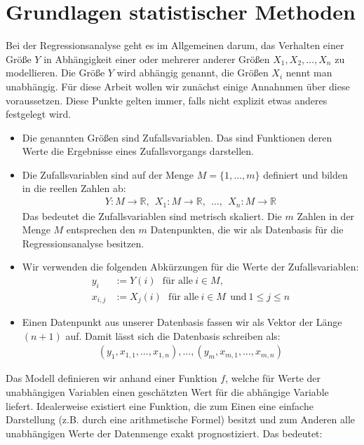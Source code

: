 \chapter{Grundlagen statistischer Methoden}

Bei der Regressionsanalyse geht es im Allgemeinen darum, das Verhalten einer Größe $Y$ in Abhängigkeit einer oder mehrerer anderer Größen $X_1, X_2, \dots, X_n$ zu modellieren. Die Größe $Y$ wird abhängig genannt, die Größen $X_i$ nennt man unabhängig. Für diese Arbeit wollen wir zunächst einige Annahnmen über diese voraussetzen. Diese Punkte gelten immer, falls nicht explizit etwas anderes festgelegt wird.
\begin{itemize}
    \item Die genannten Größen sind Zufallsvariablen. Das sind Funktionen deren Werte die Ergebnisse eines Zufallsvorgangs darstellen.
    \item Die Zufallsvariablen sind auf der Menge $M = \{1, \dots, m\}$ definiert und bilden in die reellen Zahlen ab:
    \begin{align*}
        Y: M \rightarrow \mathbb{R},~~ X_1: M \rightarrow \mathbb{R},~~ \dots,~~ X_n: M \rightarrow \mathbb{R}
    \end{align*}
    Das bedeutet die Zufallsvariablen sind metrisch skaliert. Die $m$ Zahlen in der Menge $M$ entsprechen den $m$ Datenpunkten, die wir als Datenbasis für die Regressionsanalyse besitzen.
    \item Wir verwenden die folgenden Abkürzungen für die Werte der Zufallsvariablen:
    \begin{align*}
        y_i &:= Y(i) ~~~\text{für alle}~ i \in M,\\
        x_{i, j} &:= X_j(i) ~~~\text{für alle}~ i \in M ~~\text{und}~ 1 \leq j \leq n
    \end{align*}
    \item Einen Datenpunkt aus unserer Datenbasis fassen wir als Vektor der Länge $(n + 1)$ auf. Damit lässt sich die Datenbasis schreiben als:
    \begin{align*}
        (y_1, x_{1,1}, \dots, x_{1,n}), \dots, (y_m, x_{m,1}, \dots, x_{m,n})
    \end{align*}
\end{itemize}
Das Modell definieren wir anhand einer Funktion $f$, welche für Werte der unabhängigen Variablen einen geschätzten Wert für die abhängige Variable liefert. Idealerweise existiert eine Funktion, die zum Einen eine einfache Darstellung (z.B. durch eine arithmetische Formel) besitzt und zum Anderen alle unabhängigen Werte der Datenmenge exakt prognostiziert. Das bedeutet:
